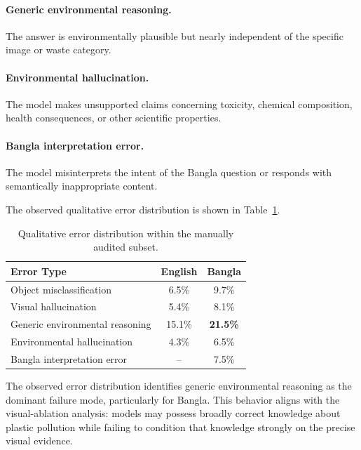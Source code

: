 \documentclass{article}
\begin{document}
\paragraph{Generic environmental reasoning.}
The answer is environmentally plausible but nearly independent of the specific image or waste category.

\paragraph{Environmental hallucination.}
The model makes unsupported claims concerning toxicity, chemical composition, health consequences, or other scientific properties.

\paragraph{Bangla interpretation error.}
The model misinterprets the intent of the Bangla question or responds with semantically inappropriate content.

The observed qualitative error distribution is shown in Table~\ref{tab:error_distribution}.

\begin{table}[t]
\centering
\caption{Qualitative error distribution within the manually audited subset.}
\label{tab:error_distribution}
\begin{tabular}{lcc}
\toprule
\textbf{Error Type}
& \textbf{English}
& \textbf{Bangla} \\
\midrule
Object misclassification
& 6.5\%
& 9.7\% \\

Visual hallucination
& 5.4\%
& 8.1\% \\

Generic environmental reasoning
& 15.1\%
& \textbf{21.5\%} \\

Environmental hallucination
& 4.3\%
& 6.5\% \\

Bangla interpretation error
& --
& 7.5\% \\
\bottomrule
\end{tabular}
\end{table}

The observed error distribution identifies generic environmental reasoning as the dominant failure mode, particularly for Bangla. This behavior aligns with the visual-ablation analysis: models may possess broadly correct knowledge about plastic pollution while failing to condition that knowledge strongly on the precise visual evidence.
\end{document}
